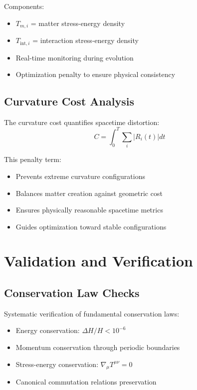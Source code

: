 \documentclass[11pt]{article}
\begin{document}
Components:
\begin{itemize}
\item $T_{m,i}$ = matter stress-energy density
\item $T_{\text{int},i}$ = interaction stress-energy density
\item Real-time monitoring during evolution
\item Optimization penalty to ensure physical consistency
\end{itemize}

\subsection{Curvature Cost Analysis}

The curvature cost quantifies spacetime distortion:
\begin{equation}
C = \int_0^T \sum_i |R_i(t)| dt
\end{equation}

This penalty term:
\begin{itemize}
\item Prevents extreme curvature configurations
\item Balances matter creation against geometric cost
\item Ensures physically reasonable spacetime metrics
\item Guides optimization toward stable configurations
\end{itemize}

\section{Validation and Verification}

\subsection{Conservation Law Checks}

Systematic verification of fundamental conservation laws:
\begin{itemize}
\item Energy conservation: $\Delta H/H < 10^{-6}$
\item Momentum conservation through periodic boundaries
\item Stress-energy conservation: $\nabla_\mu T^{\mu\nu} = 0$
\item Canonical commutation relations preservation
\end{itemize}
\end{document}
